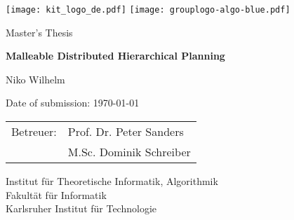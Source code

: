 \documentclass[enabledeprecatedfontcommands,12pt,a4paper,twoside]{scrartcl}
\numberwithin{equation}{section}
\begin{document}

\pagestyle{empty} %

\begin{titlepage}

  \begin{center}\large

    \quad\texttt{[image: kit\_logo\_de.pdf]} \hfill
    \texttt{[image: grouplogo-algo-blue.pdf]}\quad\null

    \vfill

    Master's Thesis
    \vspace*{2cm}

    {\bf\huge Malleable Distributed Hierarchical Planning \par}

    \vfill

    Niko Wilhelm

    \vspace*{15mm}

    Date of submission: \today

    \vspace*{45mm}

    \begin{tabular}{rl}
      Betreuer: & Prof. Dr. Peter Sanders \\
      & M.Sc. Dominik Schreiber \\
    \end{tabular}
    
    \vspace*{10mm}

    Institut für Theoretische Informatik, Algorithmik \\
    Fakultät für Informatik \\
    Karlsruher Institut für Technologie


    \vspace*{12mm}
  \end{center}

\end{titlepage}
\end{document}
